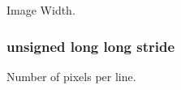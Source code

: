 Image Width. 

\hypertarget{group__img__data_gae22a1caf8c1be2e52197e6da2f5c7bb6}{
\subsubsection[{stride}]{\setlength{\rightskip}{0pt plus 5cm}unsigned long long {\bf stride}}}
\label{group__img__data_gae22a1caf8c1be2e52197e6da2f5c7bb6}


Number of pixels per line. 

